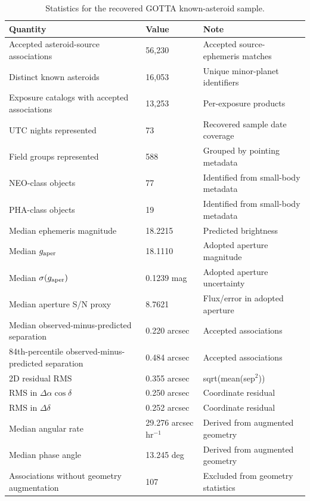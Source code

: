 \begin{table}
\centering
\caption{Statistics for the recovered GOTTA known-asteroid sample.}
\label{tab:summary}
\footnotesize
\setlength{\tabcolsep}{6pt}
\renewcommand{\arraystretch}{1.12}
\begin{tabular}{p{}p{}p{}}
\toprule
Quantity & Value & Note \\
\midrule
Accepted asteroid-source associations & 56,230 & Accepted source-ephemeris matches \\
Distinct known asteroids & 16,053 & Unique minor-planet identifiers \\
Exposure catalogs with accepted associations & 13,253 & Per-exposure products \\
UTC nights represented & 73 & Recovered sample date coverage \\
Field groups represented & 588 & Grouped by pointing metadata \\
NEO-class objects & 77 & Identified from small-body metadata \\
PHA-class objects & 19 & Identified from small-body metadata \\
Median ephemeris magnitude & 18.2215 & Predicted brightness \\
Median $g_{\rm aper}$ & 18.1110 & Adopted aperture magnitude \\
Median $\sigma(g_{\rm aper})$ & 0.1239 mag & Adopted aperture uncertainty \\
Median aperture S/N proxy & 8.7621 & Flux/error in adopted aperture \\
Median observed-minus-predicted separation & 0.220 arcsec & Accepted associations \\
84th-percentile observed-minus-predicted separation & 0.484 arcsec & Accepted associations \\
2D residual RMS & 0.355 arcsec & sqrt(mean(sep$^2$)) \\
RMS in $\Delta\alpha\cos\delta$ & 0.250 arcsec & Coordinate residual \\
RMS in $\Delta\delta$ & 0.252 arcsec & Coordinate residual \\
Median angular rate & 29.276 arcsec hr$^{-1}$ & Derived from augmented geometry \\
Median phase angle & 13.245 deg & Derived from augmented geometry \\
Associations without geometry augmentation & 107 & Excluded from geometry statistics \\
\bottomrule
\end{tabular}
\end{table}
